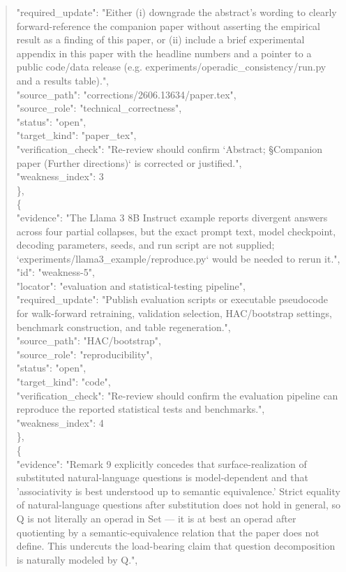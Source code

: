 \documentclass[11pt]{article}
\begin{document}
\begin{quote}
      "required\_update": "Either (i) downgrade the abstract's wording to clearly forward-reference the companion paper without asserting the empirical result as a finding of this paper, or (ii) include a brief experimental appendix in this paper with the headline numbers and a pointer to a public code/data release (e.g. experiments/operadic\_consistency/run.py and a results table).",\\
      "source\_path": "corrections/2606.13634/paper.tex",\\
      "source\_role": "technical\_correctness",\\
      "status": "open",\\
      "target\_kind": "paper\_tex",\\
      "verification\_check": "Re-review should confirm `Abstract; §Companion paper (Further directions)` is corrected or justified.",\\
      "weakness\_index": 3\\
    \},\\
    \{\\
      "evidence": "The Llama 3 8B Instruct example reports divergent answers across four partial collapses, but the exact prompt text, model checkpoint, decoding parameters, seeds, and run script are not supplied; `experiments/llama3\_example/reproduce.py` would be needed to rerun it.",\\
      "id": "weakness-5",\\
      "locator": "evaluation and statistical-testing pipeline",\\
      "required\_update": "Publish evaluation scripts or executable pseudocode for walk-forward retraining, validation selection, HAC/bootstrap settings, benchmark construction, and table regeneration.",\\
      "source\_path": "HAC/bootstrap",\\
      "source\_role": "reproducibility",\\
      "status": "open",\\
      "target\_kind": "code",\\
      "verification\_check": "Re-review should confirm the evaluation pipeline can reproduce the reported statistical tests and benchmarks.",\\
      "weakness\_index": 4\\
    \},\\
    \{\\
      "evidence": "Remark 9 explicitly concedes that surface-realization of substituted natural-language questions is model-dependent and that 'associativity is best understood up to semantic equivalence.' Strict equality of natural-language questions after substitution does not hold in general, so Q is not literally an operad in Set --- it is at best an operad after quotienting by a semantic-equivalence relation that the paper does not define. This undercuts the load-bearing claim that question decomposition is naturally modeled by Q.",\\

\end{quote}
\end{document}
